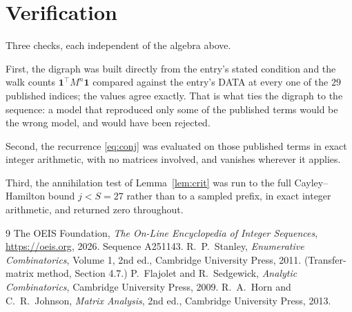\documentclass[11pt,a4paper]{article}
\theoremstyle{plain}
\theoremstyle{definition}
\begin{document}
\section{Verification}

Three checks, each independent of the algebra above.

First, the digraph was built directly from the entry's stated condition and the walk counts
$\mathbf{1}^{\!\top}M^{n}\mathbf{1}$ compared against the entry's DATA at every one of
the $29$ published indices; the values agree exactly. That is what ties the digraph to
the sequence: a model that reproduced only some of the published terms would be the wrong
model, and would have been rejected.

Second, the recurrence \eqref{eq:conj} was evaluated on those published terms in exact
integer arithmetic, with no matrices involved, and vanishes wherever it applies.

Third, the annihilation test of Lemma~\ref{lem:crit} was run to the full Cayley--Hamilton
bound $j<S=27$ rather than to a sampled prefix, in exact integer arithmetic, and returned
zero throughout.

\begin{thebibliography}{9}
 The OEIS Foundation, \emph{The On-Line Encyclopedia of Integer
Sequences}, \url{https://oeis.org}, 2026. Sequence A251143.
 R.~P.~Stanley, \emph{Enumerative Combinatorics}, Volume 1, 2nd ed.,
Cambridge University Press, 2011. (Transfer-matrix method, Section 4.7.)
 P.~Flajolet and R.~Sedgewick, \emph{Analytic Combinatorics}, Cambridge
University Press, 2009.
 R.~A.~Horn and C.~R.~Johnson, \emph{Matrix Analysis}, 2nd ed., Cambridge
University Press, 2013.
\end{thebibliography}
\end{document}
